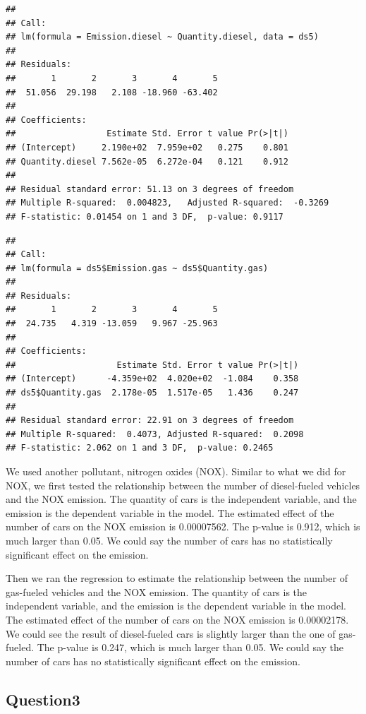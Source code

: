 \documentclass[
  12pt,
]{article}
\begin{document}
\begin{verbatim}
## 
## Call:
## lm(formula = Emission.diesel ~ Quantity.diesel, data = ds5)
## 
## Residuals:
##       1       2       3       4       5 
##  51.056  29.198   2.108 -18.960 -63.402 
## 
## Coefficients:
##                  Estimate Std. Error t value Pr(>|t|)
## (Intercept)     2.190e+02  7.959e+02   0.275    0.801
## Quantity.diesel 7.562e-05  6.272e-04   0.121    0.912
## 
## Residual standard error: 51.13 on 3 degrees of freedom
## Multiple R-squared:  0.004823,   Adjusted R-squared:  -0.3269 
## F-statistic: 0.01454 on 1 and 3 DF,  p-value: 0.9117
\end{verbatim}

\begin{verbatim}
## 
## Call:
## lm(formula = ds5$Emission.gas ~ ds5$Quantity.gas)
## 
## Residuals:
##       1       2       3       4       5 
##  24.735   4.319 -13.059   9.967 -25.963 
## 
## Coefficients:
##                    Estimate Std. Error t value Pr(>|t|)
## (Intercept)      -4.359e+02  4.020e+02  -1.084    0.358
## ds5$Quantity.gas  2.178e-05  1.517e-05   1.436    0.247
## 
## Residual standard error: 22.91 on 3 degrees of freedom
## Multiple R-squared:  0.4073, Adjusted R-squared:  0.2098 
## F-statistic: 2.062 on 1 and 3 DF,  p-value: 0.2465
\end{verbatim}

We used another pollutant, nitrogen oxides (NOX). Similar to what we did
for NOX, we first tested the relationship between the number of
diesel-fueled vehicles and the NOX emission. The quantity of cars is the
independent variable, and the emission is the dependent variable in the
model. The estimated effect of the number of cars on the NOX emission is
0.00007562. The p-value is 0.912, which is much larger than 0.05. We
could say the number of cars has no statistically significant effect on
the emission.

Then we ran the regression to estimate the relationship between the
number of gas-fueled vehicles and the NOX emission. The quantity of cars
is the independent variable, and the emission is the dependent variable
in the model. The estimated effect of the number of cars on the NOX
emission is 0.00002178. We could see the result of diesel-fueled cars is
slightly larger than the one of gas-fueled. The p-value is 0.247, which
is much larger than 0.05. We could say the number of cars has no
statistically significant effect on the emission.

\hypertarget{question3}{%
\subsection{Question3}\label{question3}}
\end{document}
